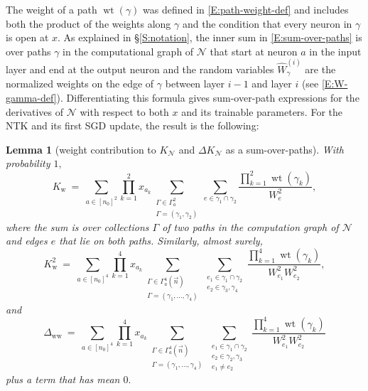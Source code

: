 \documentclass[11pt, reqno]{amsart}
\newtheorem{lemma}[theorem]{Lemma}
\newcommand{\lr}[1]{\ensuremath{\left(#1 \right)}}
\newcommand{\mN}{\mathcal N}
\newcommand{\Kw}{K_{\mathrm{w}}}
\newcommand{\Dww}{\Delta_{\mathrm{ww}}}
\DeclareMathOperator{\wt}{wt}
\begin{document}
The weight of a path $\wt(\gamma)$ was defined in \eqref{E:path-weight-def} and includes both the product of the weights along $\gamma$ and the condition that every neuron in $\gamma$ is open at $x$. As explained in \S \ref{S:notation}, the inner sum in \eqref{E:sum-over-paths} is over paths $\gamma$ in the computational graph of $\mN$ that start at neuron $a$ in the input layer and end at the output neuron and the random variables $\widehat{W}_\gamma^{(i)}$ are the normalized weights on the edge of $\gamma$ between layer $i-1$ and layer $i$ (see \eqref{E:W-gamma-def}). Differentiating this formula gives sum-over-path expressions for the derivatives of $\mN$ with respect to both $x$ and its trainable parameters. For the NTK and its first SGD update, the result is the following: 
\begin{lemma}[weight contribution to $K_{\mN}$ and $\Delta K_{\mN}$ as a sum-over-paths]\label{L:paths-raw}
With probability $1,$
  \[\Kw~=~\sum_{a\in [n_0]^2}\prod_{k=1}^2x_{a_k} \sum_{\substack{\Gamma\in \Gamma_a^2\\\Gamma = \lr{\gamma_1,\gamma_2}}} \sum_{e\in \gamma_1\cap \gamma_2} \frac{\prod_{k=1}^2 \wt(\gamma_k)}{W_{e}^2},\]
  where the sum is over collections $\Gamma$ of two paths in the computation graph of $\mN$ and edges $e$ that lie on both paths. Similarly, almost surely, 
  \[\Kw^2~=~\sum_{a\in [n_0]^4}\prod_{k=1}^4x_{a_k} \sum_{\substack{\Gamma\in \Gamma_a^4(\vec{n})\\\Gamma = \lr{\gamma_1,\ldots, \gamma_4}}} \sum_{\substack{e_1\in \gamma_1\cap \gamma_2\\ e_2\in \gamma_3,\gamma_4}} \frac{\prod_{k=1}^4\wt(\gamma_k)}{W_{e_1}^2W_{e_2}^2},\]
and
  \[\Dww~=~\sum_{a\in [n_0]^4}\prod_{k=1}^4x_{a_k} \sum_{\substack{\Gamma\in \Gamma_a^4(\vec{n})\\\Gamma = \lr{\gamma_1,\ldots,\gamma_4}}} \sum_{\substack{e_1\in \gamma_1\cap \gamma_2\\ e_2\in \gamma_2,\gamma_3\\ e_1\neq e_2}} \frac{\prod_{k=1}^4\wt(\gamma_k)}{W_{e_1}^2W_{e_2}^2}\]
plus a term that has mean $0.$ 
\end{lemma}
\end{document}
